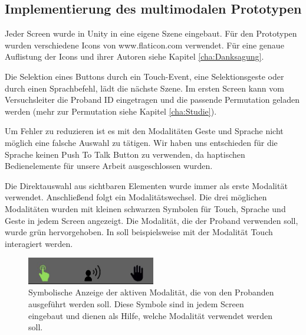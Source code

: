 \subsection[Implementierung]{Implementierung des multimodalen Prototypen}
Jeder Screen wurde in Unity in eine eigene Szene eingebaut. Für den Prototypen wurden verschiedene Icons von www.flaticon.com verwendet. 
Für eine genaue Auflistung der Icons und ihrer Autoren siehe Kapitel \ref{cha:Danksagung}.

Die Selektion eines Buttons durch ein Touch-Event, eine Selektionsgeste oder durch einen Sprachbefehl, lädt die nächste Szene. 
Im ersten Screen kann vom Versuchsleiter die Proband ID eingetragen und die passende Permutation geladen werden (mehr zur Permutation siehe Kapitel \ref{cha:Studie}).

Um Fehler zu reduzieren ist es mit den Modalitäten Geste und Sprache nicht möglich eine falsche Auswahl zu tätigen. 
Wir haben uns entschieden für die Sprache keinen Push To Talk Button zu verwenden, da haptischen Bedienelemente für unsere Arbeit ausgeschlossen wurden. 

Die Direktauswahl aus sichtbaren Elementen wurde immer als erste Modalität verwendet.
Anschließend folgt ein Modalitätswechsel. 
Die drei möglichen Modalitäten wurden mit kleinen schwarzen Symbolen für Touch, Sprache und Geste in jedem Screen angezeigt. 
Die Modalität, die der Proband verwenden soll, wurde grün hervorgehoben. 
In  soll beispielsweise mit der Modalität Touch interagiert werden. 
\begin{figure}[ht]
  \centering
  \includegraphics[width=0.5\textwidth]{img/ModusAktiv.jpg}
  \caption[Symbolische Anzeige der aktiven Modalität]{Symbolische Anzeige der aktiven Modalität, die von den Probanden ausgeführt werden soll. Diese Symbole sind in jedem Screen eingebaut und dienen als Hilfe, welche Modalität verwendet werden soll.}
  \label{fig:ModusAktiv}
\end{figure}

